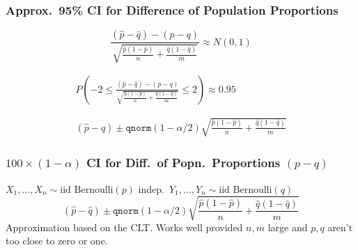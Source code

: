 \documentclass{beamer}
\begin{document}
\begin{frame}
\frametitle{Approx.\ 95\% CI for Difference of Population Proportions}


$$\frac{(\widehat{p} - \widehat{q}) - (p - q)}{\sqrt{\frac{\widehat{p}(1-\widehat{p})}{n} + \frac{\widehat{q}(1-\widehat{q})}{m}}} \approx N(0,1)$$
 

 

\begin{eqnarray*}
	P\left( -2 \leq  \frac{(\widehat{p} - \widehat{q}) - (p - q)}{\sqrt{\frac{\widehat{p}(1-\widehat{p})}{n} + \frac{\widehat{q}(1-\widehat{q})}{m}}}\leq 2\right) \approx 0.95 \\ \\ \\ 
	(\widehat{p} - \widehat{q}) \pm \texttt{qnorm}(1-\alpha/2) \sqrt{\frac{\widehat{p}(1-\widehat{p})}{n} + \frac{\widehat{q}(1-\widehat{q})}{m}}
\end{eqnarray*}

\end{frame}

\begin{frame}
\frametitle{$100\times(1-\alpha)$ CI for Diff.\ of Popn.\ Proportions $(p-q)$}
$X_1, \hdots, X_n \sim \mbox{iid Bernoulli}(p)$ indep.\ $Y_1, \hdots, Y_n \sim \mbox{iid Bernoulli}(q)$
	$$(\widehat{p} - \widehat{q}) \pm \texttt{qnorm}(1-\alpha/2) \sqrt{\frac{\widehat{p}(1-\widehat{p})}{n} + \frac{\widehat{q}(1-\widehat{q})}{m}}$$
	\alert{Approximation based on the CLT. Works well provided $n,m$ large and $p,q$ aren't too close to zero or one.}
\end{frame}
\end{document}

